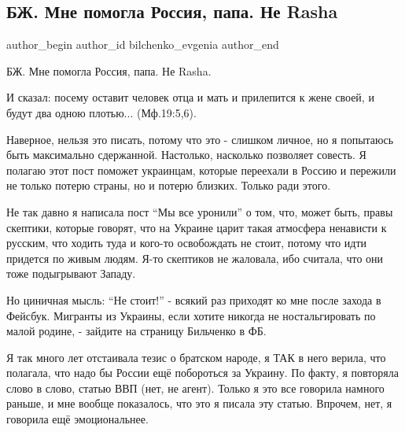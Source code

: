  
 
 
 
 
\subsection{БЖ. Мне помогла Россия, папа. Не Rasha}
\label{sec:08_01_2022.tg.bilchenko_evgenia.1.rossia_papa_rasha}

\ifcmt
 author_begin
   author_id bilchenko_evgenia
 author_end
\fi

БЖ. Мне помогла Россия, папа. Не Rasha.

И сказал: посему оставит человек отца и мать и прилепится к жене своей, и будут
два одною плотью... (Мф.19:5,6).


Наверное, нельзя это писать, потому что это - слишком личное, но я попытаюсь
быть максимально сдержанной. Настолько, насколько позволяет совесть. Я полагаю
этот пост поможет украинцам, которые переехали в Россию и пережили не только
потерю страны, но и потерю близких. Только ради этого.

Не так давно я написала пост \enquote{Мы все уронили} о том, что, может быть,
правы скептики, которые говорят, что на Украине царит такая атмосфера ненависти
к русским, что ходить туда и кого-то освобождать не стоит, потому что идти
придется по живым людям. Я-то скептиков не жаловала, ибо считала, что они тоже
подыгрывают Западу. 

Но циничная мысль: \enquote{Не стоит!} - всякий раз приходят ко мне после
захода в Фейсбук. Мигранты из Украины, если хотите никогда не ностальгировать
по малой родине, - зайдите на страницу Бильченко в ФБ.

Я так много лет отстаивала тезис о братском народе, я ТАК в него верила, что
полагала, что надо бы России ещё побороться за Украину. По факту, я повторяла
слово в слово, статью ВВП (нет, не агент). Только я это все говорила намного
раньше, и мне вообще показалось, что это я писала эту статью. Впрочем, нет, я
говорила ещё эмоциональнее. 

